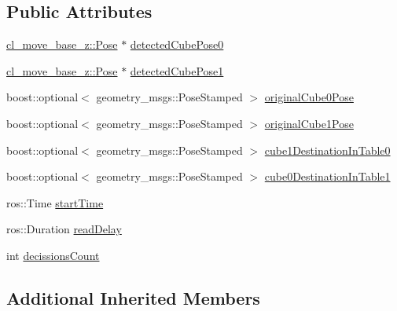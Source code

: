 \subsection*{Public Attributes}
\begin{DoxyCompactItemize}
\item 
\hyperlink{classcl__move__base__z_1_1Pose}{cl\+\_\+move\+\_\+base\+\_\+z\+::\+Pose} $\ast$ \hyperlink{classsm__moveit_1_1cl__perception__system_1_1ClPerceptionSystem_a4bf0838041a73d41008c2cb2daa6fb63}{detected\+Cube\+Pose0}
\item 
\hyperlink{classcl__move__base__z_1_1Pose}{cl\+\_\+move\+\_\+base\+\_\+z\+::\+Pose} $\ast$ \hyperlink{classsm__moveit_1_1cl__perception__system_1_1ClPerceptionSystem_ae09f06cb609d0a233fa9a0d31dcb09c6}{detected\+Cube\+Pose1}
\item 
boost\+::optional$<$ geometry\+\_\+msgs\+::\+Pose\+Stamped $>$ \hyperlink{classsm__moveit_1_1cl__perception__system_1_1ClPerceptionSystem_a763b8723ae96eb30fd21e039e3f52c47}{original\+Cube0\+Pose}
\item 
boost\+::optional$<$ geometry\+\_\+msgs\+::\+Pose\+Stamped $>$ \hyperlink{classsm__moveit_1_1cl__perception__system_1_1ClPerceptionSystem_ab8851b53535efa7e154248c119e8c3cd}{original\+Cube1\+Pose}
\item 
boost\+::optional$<$ geometry\+\_\+msgs\+::\+Pose\+Stamped $>$ \hyperlink{classsm__moveit_1_1cl__perception__system_1_1ClPerceptionSystem_a13cf34b1fb711829c4ddb9a9e2899ae9}{cube1\+Destination\+In\+Table0}
\item 
boost\+::optional$<$ geometry\+\_\+msgs\+::\+Pose\+Stamped $>$ \hyperlink{classsm__moveit_1_1cl__perception__system_1_1ClPerceptionSystem_ab84bbc2d5e5a7ef7839a0ade56942679}{cube0\+Destination\+In\+Table1}
\item 
ros\+::\+Time \hyperlink{classsm__moveit_1_1cl__perception__system_1_1ClPerceptionSystem_a115fa9b61255bafa00931484f60d993a}{start\+Time}
\item 
ros\+::\+Duration \hyperlink{classsm__moveit_1_1cl__perception__system_1_1ClPerceptionSystem_a9aa5caee6cc5bfbbba2717d2073ead39}{read\+Delay}
\item 
int \hyperlink{classsm__moveit_1_1cl__perception__system_1_1ClPerceptionSystem_ab8272ccb5af7401beeb4e9eaf1d86fa3}{decissions\+Count}
\end{DoxyCompactItemize}
\subsection*{Additional Inherited Members}


